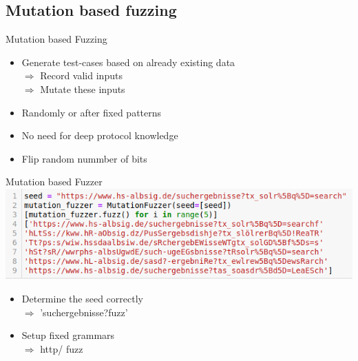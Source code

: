 \documentclass{beamer}
\begin{document}
\subsection{Mutation based fuzzing}
\begin{frame}{Mutation based Fuzzing}
\begin{itemize}
 \item Generate test-cases based on already existing data\\
 $\Rightarrow$ Record valid inputs\\
 $\Rightarrow$ Mutate these inputs
 \item Randomly or after fixed patterns
 \item No need for deep protocol knowledge
 \item Flip random nummber of bits
 
 
\end{itemize}
\end{frame}
\begin{frame}{Mutation based Fuzzer}
\includegraphics[scale=0.5]{mutatate.png}
\end{frame}
\begin{frame}
 \begin{itemize}
 \item Determine the seed correctly\\
 $\Rightarrow$ 'suchergebnisse?fuzz'
  \item Setup fixed grammars\\
  $\Rightarrow$ http/
  fuzz
 \end{itemize}
 
\end{frame}
\end{document}
